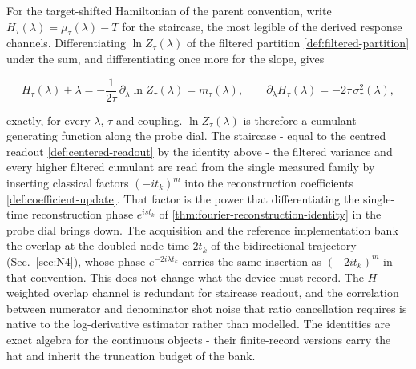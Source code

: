 For the target-shifted Hamiltonian of the parent convention, write $H_\tau(\lambda)=\mu_\tau(\lambda)-T$ for the staircase, the most legible of the derived response channels. Differentiating $\ln Z_\tau(\lambda)$ of the filtered partition \eqref{def:filtered-partition} under the sum, and differentiating once more for the slope, gives
\begin{widetext}
\begin{equation}\label{thm:staircase-cumulant-identities}
H_\tau(\lambda)+\lambda=-\frac{1}{2\tau}\,\partial_\lambda \ln Z_\tau(\lambda)=m_\tau(\lambda),\qquad \partial_\lambda H_\tau(\lambda)=-2\tau\,\sigma_\tau^{2}(\lambda),
\end{equation}
\end{widetext}
exactly, for every $\lambda$, $\tau$ and coupling. $\ln Z_\tau(\lambda)$ is therefore a cumulant-generating function along the probe dial. The staircase - equal to the centred readout \eqref{def:centered-readout} by the identity above - the filtered variance and every higher filtered cumulant are read from the single measured family by inserting classical factors $(-it_k)^{m}$ into the reconstruction coefficients \eqref{def:coefficient-update}. That factor is the power that differentiating the single-time reconstruction phase $e^{ist_k}$ of \eqref{thm:fourier-reconstruction-identity} in the probe dial brings down. The acquisition and the reference implementation bank the overlap at the doubled node time $2t_k$ of the bidirectional trajectory (Sec.~\ref{sec:N4}), whose phase $e^{-2i\lambda t_k}$ carries the same insertion as $(-2it_k)^{m}$ in that convention. This does not change what the device must record. The $H$-weighted overlap channel is redundant for staircase readout, and the correlation between numerator and denominator shot noise that ratio cancellation requires is native to the log-derivative estimator rather than modelled. The identities are exact algebra for the continuous objects - their finite-record versions carry the hat and inherit the truncation budget of the bank.

